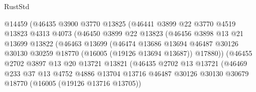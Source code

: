 \begin{lexlean}{RustStd}
\begin{coremodule}
                            @14459
                            (@46435
                              @3900
                              @3770
                              @13825
                              (@46441
                                @3899
                                @22
                                @3770
                                @4519
                                @13823
                                @4313
                                @4073
                                (@46450
                                  @3899
                                  @22
                                  @13823
                                  (@46456
                                    @3898
                                    @13
                                    @21
                                    @13699
                                    @13822
                                    (@46463
                                      @13699
                                      (@46474
                                        @13686
                                        @13694
                                        @46487
                                        @30126
                                        @30130
                                        @30259
                                        @18770
                                        (@16005 (@19126 @13694 @13687))
                                        @17880))
                                    (@46455
                                      @2702
                                      @3897
                                      @13
                                      @20
                                      @13721
                                      @13821
                                      (@46435
                                        @2702
                                        @13
                                        @13721
                                        (@46469
                                          @233
                                          @37
                                          @13
                                          @4752
                                          @4886
                                          @13704
                                          @13716
                                          @46487
                                          @30126
                                          @30130
                                          @30679
                                          @18770
                                          (@16005 (@19126 @13716 @13705))

\end{coremodule}
\end{lexlean}
